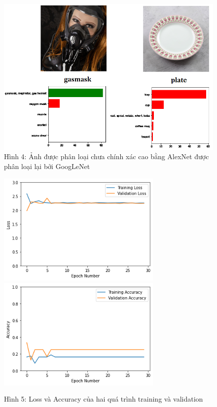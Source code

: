 \documentclass[a4paper]{article}
\begin{document}
\begin{figure}[h!]
\centering
\includegraphics[width=16cm]{images/res3.PNG}
\caption*{Hình 4: Ảnh được phân loại chưa chính xác cao bằng AlexNet được phân loại lại bởi GoogLeNet}
\end{figure}

\clearpage

\begin{figure}[h!]
\centering
{{\includegraphics[width=8cm]{images/loss.png} }}
\qquad
{{\includegraphics[width=8cm]{images/acc.png} }}
\caption*{Hình 5: Loss và Accuracy của hai quá trình training và validation}
\end{figure}
\end{document}
